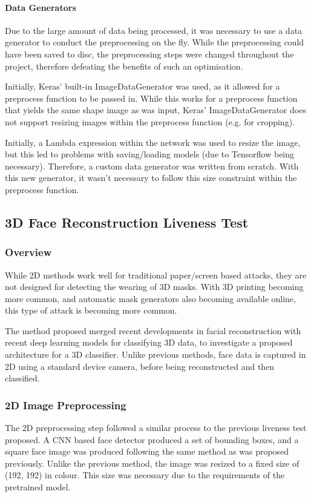 \documentclass[11pt,a4paper]{article}
\begin{document}
                \paragraph{Data Generators}
                    Due to the large amount of data being processed, it was necessary to use a data generator to conduct the preprocessing on the fly. While the preprocessing
                    could have been saved to disc, the preprocessing steps were changed throughout the project, therefore defeating the benefits of such an optimisation.

                    Initially, Keras' built-in ImageDataGenerator was used, as it allowed for a preprocess function to be passed in. While this works for a preprocess function that yields the same shape image
                    as was input, Keras' ImageDataGenerator does not support resizing images within the preprocess function (e.g. for cropping).

                    Initially, a Lambda expression within the network was used to resize the image, but this led to problems with saving/loading models (due to Tensorflow being necessary).
                    Therefore, a custom data generator was written from scratch. With this new generator, it wasn't necessary to follow this size constraint within the preprocess function.


    \subsection{3D Face Reconstruction Liveness Test}
        \subsubsection{Overview}
            While 2D methods work well for traditional paper/screen based attacks, they are not designed for detecting the wearing of 3D masks. With 3D printing
            becoming more common, and automatic mask generators also becoming available online, this type of attack is becoming more common.

            The method proposed merged recent developments in facial reconstruction with recent deep learning models for classifying 3D data, to investigate a proposed
            architecture for a 3D classifier. Unlike previous methods, face data is captured in 2D using a standard device camera, before being reconstructed and then classified.

        \subsubsection{2D Image Preprocessing}
            The 2D preprocessing step followed a similar process to the previous liveness test proposed. A CNN based face detector produced a set of bounding boxes, and a square face image was produced
            following the same method as was proposed previously. Unlike the previous method, the image was resized to a fixed size of (192, 192) in colour. This size was necessary due to the requirements
            of the pretrained model.
\end{document}
